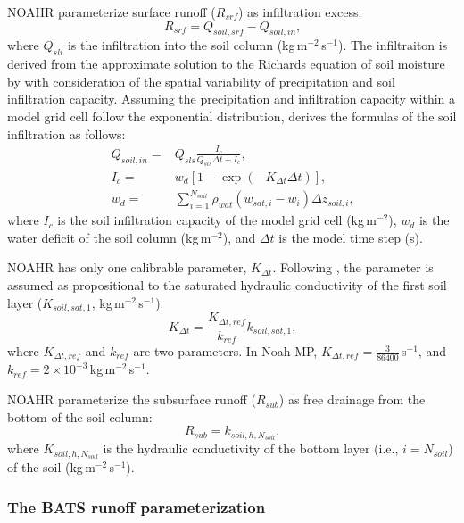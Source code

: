 \documentclass[essd]{copernicus}
\begin{document}
NOAHR parameterize surface runoff (\(R_{srf}\)) as infiltration excess:
\begin{equation}
    R_{srf} = Q_{soil,srf} - Q_{soil,in} \text{,}
\end{equation}
where \(Q_{sli}\) is the infiltration into the soil column
(kg\,m$^{-2}$\,s$^{-1}$). The infiltraiton is derived from the approximate
solution to the Richards equation of soil moisture by \citet{philip1969AiH} with
consideration of the spatial variability of precipitation and soil infiltration
capacity. Assuming the precipitation and infiltration capacity within a model
grid cell follow the exponential distribution, \citet{schaake1996JGRA} derives
the formulas of the soil infiltration as follows:
\begin{align}
    Q_{soil,in} = & Q_{sls} \frac{I_c}{Q_{sls} \Delta t + I_c} \text{,} \\
    I_{c} =       & w_d [1-\exp(-K_{\Delta t} \Delta t)] \text{,} \\
    w_d =         & \sum_{i=1}^{N_{soil}} \rho_{wat} (w_{sat,i} - w_i) \Delta z_{soil,i}
    \text{,}
\end{align}
where \(I_{c}\) is the soil infiltration capacity of the model grid cell
(kg\,m$^{-2}$), \(w_d\) is the water deficit of the soil column (kg\,m$^{-2}$),
and \(\Delta t\) is the model time step (s).

NOAHR has only one calibrable parameter, \(K_{\Delta t}\). Following
\citet{chen2001MWR}, the parameter is assumed as propositional to the saturated
hydraulic conductivity of the first soil layer (\(K_{soil,sat,1}\),
kg\,m$^{-2}$\,s$^{-1}$):
\begin{equation}
    K_{\Delta t} = \frac{{K}_{\Delta t, ref}}{k_{ref}} k_{soil,sat,1} \text{,}
\end{equation}
where $K_{\Delta t,ref}$ and \(k_{ref}\) are two parameters. In Noah-MP,
\(K_{\Delta t,ref} = \frac{3}{86400}\)\,s$^{-1}$, and \(k_{ref}=2 \times
10^{-3}\)\,kg\,m$^{-2}$\,s$^{-1}$.

NOAHR parameterize the subsurface runoff (\(R_{sub}\)) as free drainage from the
bottom of the soil column:
\begin{equation}
    R_{sub} = k_{soil,h,N_{soil}} \label{eq:NOAHR:rsub} \text{,}
\end{equation}
where \(K_{soil,h,N_{soil}}\) is the hydraulic conductivity of the bottom layer
(i.e., \(i=N_{soil}\)) of the soil (kg\,m$^{-2}$\,s$^{-1}$).


\subsubsection{The BATS runoff parameterization}
\end{document}
